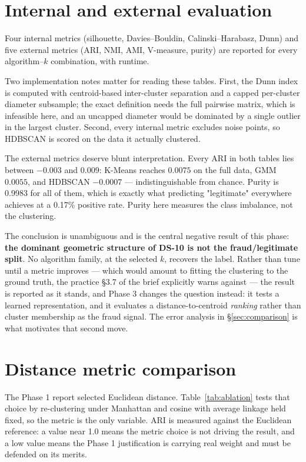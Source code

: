 \documentclass[11pt, a4paper]{article}
\providecommand{\num}[1]{#1}
\begin{document}
\section{Internal and external evaluation}
\label{sec:metrics}

Four internal metrics (silhouette, Davies--Bouldin, Calinski--Harabasz, Dunn)
and five external metrics (ARI, NMI, AMI, V-measure, purity) are reported for
every algorithm--$k$ combination, with runtime.




Two implementation notes matter for reading these tables. First, the Dunn index
is computed with centroid-based inter-cluster separation and a capped
per-cluster diameter subsample; the exact definition needs the full pairwise
matrix, which is infeasible here, and an uncapped diameter would be dominated by
a single outlier in the largest cluster. Second, every internal metric excludes
noise points, so HDBSCAN is scored on the data it actually clustered.

The external metrics deserve blunt interpretation. Every ARI in both tables lies
between $-0.003$ and $0.009$: K-Means reaches $0.0075$ on the full data, GMM
$0.0055$, and HDBSCAN $-0.0007$ --- indistinguishable from chance. Purity is
\num{0.9983} for all of them, which is exactly what predicting "legitimate"
everywhere achieves at a \num{0.17}\% positive rate. Purity here measures the
class imbalance, not the clustering.

The conclusion is unambiguous and is the central negative result of this phase:
\textbf{the dominant geometric structure of DS-10 is not the fraud/legitimate
split}. No algorithm family, at the selected $k$, recovers the label. Rather than
tune until a metric improves --- which would amount to fitting the clustering to
the ground truth, the practice \S3.7 of the brief explicitly warns against --- the
result is reported as it stands, and Phase 3 changes the question instead: it
tests a learned representation, and it evaluates a distance-to-centroid
\emph{ranking} rather than cluster membership as the fraud signal. The error
analysis in \S\ref{sec:comparison} is what motivates that second move.

\section{Distance metric comparison}

The Phase 1 report selected Euclidean distance. Table~\ref{tab:ablation} tests
that choice by re-clustering under Manhattan and cosine with average linkage
held fixed, so the metric is the only variable. ARI is measured against the
Euclidean reference: a value near 1.0 means the metric choice is not driving the
result, and a low value means the Phase 1 justification is carrying real weight
and must be defended on its merits.
\end{document}
